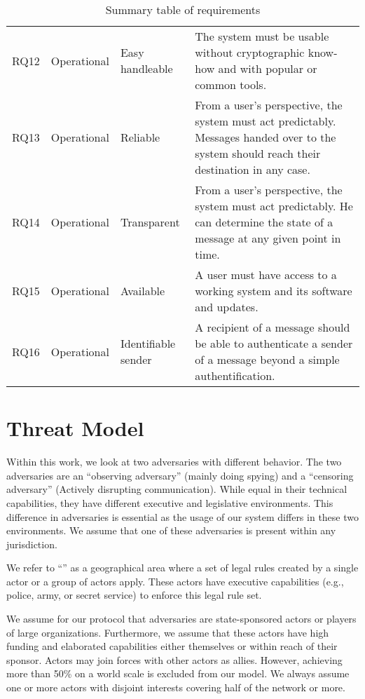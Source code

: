 \begin{table*}[ht]
\begin{tabular}{|l|l|l|p{9.8cm}|}
		RQ12 & Operational & Easy handleable     & The system must be usable without cryptographic know-how and with popular or common tools. \\
		RQ13 & Operational & Reliable            & From a user's perspective, the system must act predictably. Messages handed over to the system should reach their destination in any case. \\
		RQ14 & Operational & Transparent         & From a user's perspective, the system must act predictably. He can determine the state of a message at any given point in time. \\
		RQ15 & Operational & Available           & A user must have access to a working system and its software and updates. \\
		RQ16 & Operational & Identifiable sender & A recipient of a message should be able to authenticate a sender of a message beyond a simple authentification.\\\hline
		
	\end{tabular}
	\egroup
	\caption{Summary table of requirements}
	\label{tab:requiremnts}
\end{table*}

\section{Threat Model}\label{sec:adversary}
Within this work, we look at two adversaries with different behavior. The two adversaries are an ``observing adversary'' (mainly doing spying) and a ``censoring adversary'' (Actively disrupting communication). While equal in their technical capabilities, they have different executive and legislative environments. This difference in adversaries is essential as the usage of our system differs in these two environments. We assume that one of these adversaries is present within any jurisdiction. 

We refer to ``'' as a geographical area where a set of legal rules created by a single actor or a group of actors apply. These actors have executive capabilities (e.g., police, army, or secret service) to enforce this legal rule set.

We assume for our protocol that adversaries are state-sponsored actors or players of large organizations. Furthermore, we assume that these actors have high funding and elaborated capabilities either themselves or within reach of their sponsor. Actors may join forces with other actors as allies. However, achieving more than 50\% on a world scale is excluded from our model. We always assume one or more actors with disjoint interests covering half of the network or more. 

